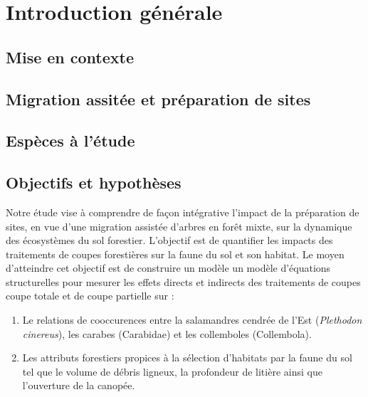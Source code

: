 \chapter*{Introduction générale}         %
\label{chap-introduction}       %

\section*{Mise en contexte}
\label{sec:contexte}


\section*{Migration assitée et préparation de sites}
\label{sec:fam}


\section*{Espèces à l'étude}
\label{sec:species}


\section*{Objectifs et hypothèses}
\label{sec:objectifs}



Notre étude vise à comprendre de façon intégrative l'impact de la préparation de sites, en vue d'une migration assistée d'arbres en forêt mixte, sur la dynamique des écosystèmes du sol forestier.
L'objectif est de quantifier les impacts des traitements de coupes forestières sur la faune du sol et son habitat. 
Le moyen d'atteindre cet objectif est de construire un modèle un modèle d'équations structurelles pour mesurer les effets directs et indirects des traitements de coupes coupe totale et de coupe partielle sur : 

\begin{enumerate}
    \item Le relations de cooccurences entre la salamandres cendrée de l'Est (\textit{Plethodon cinereus}), les carabes (Carabidae) et les collemboles (Collembola).
    \item Les attributs forestiers propices à la sélection d'habitats par la faune du sol tel que le volume de débris ligneux, la profondeur de litière ainsi que l'ouverture de la canopée. 
\end{enumerate}

